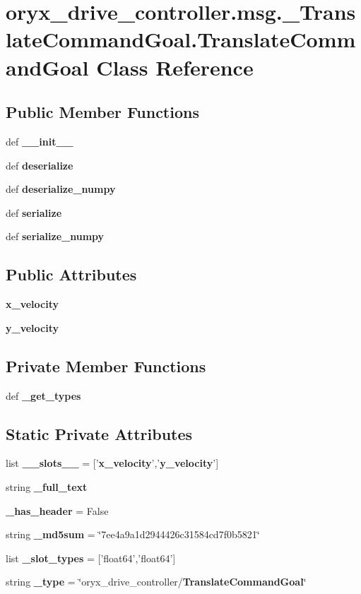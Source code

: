 \section{oryx\-\_\-drive\-\_\-controller.\-msg.\-\_\-\-Translate\-Command\-Goal.\-Translate\-Command\-Goal \-Class \-Reference}
\label{classoryx__drive__controller_1_1msg_1_1__TranslateCommandGoal_1_1TranslateCommandGoal}
\subsection*{\-Public \-Member \-Functions}
\begin{DoxyCompactItemize}
\item 
def {\bf \-\_\-\-\_\-init\-\_\-\-\_\-}
\item 
def {\bf deserialize}
\item 
def {\bf deserialize\-\_\-numpy}
\item 
def {\bf serialize}
\item 
def {\bf serialize\-\_\-numpy}
\end{DoxyCompactItemize}
\subsection*{\-Public \-Attributes}
\begin{DoxyCompactItemize}
\item 
{\bf x\-\_\-velocity}
\item 
{\bf y\-\_\-velocity}
\end{DoxyCompactItemize}
\subsection*{\-Private \-Member \-Functions}
\begin{DoxyCompactItemize}
\item 
def {\bf \-\_\-get\-\_\-types}
\end{DoxyCompactItemize}
\subsection*{\-Static \-Private \-Attributes}
\begin{DoxyCompactItemize}
\item 
list {\bf \-\_\-\-\_\-slots\-\_\-\-\_\-} = ['{\bf x\-\_\-velocity}','{\bf y\-\_\-velocity}']
\item 
string {\bf \-\_\-full\-\_\-text}
\item 
{\bf \-\_\-has\-\_\-header} = \-False
\item 
string {\bf \-\_\-md5sum} = \char`\"{}7ee4a9a1d2944426c31584cd7f0b5821\char`\"{}
\item 
list {\bf \-\_\-slot\-\_\-types} = ['float64','float64']
\item 
string {\bf \-\_\-type} = \char`\"{}oryx\-\_\-drive\-\_\-controller/{\bf \-Translate\-Command\-Goal}\char`\"{}
\end{DoxyCompactItemize}


